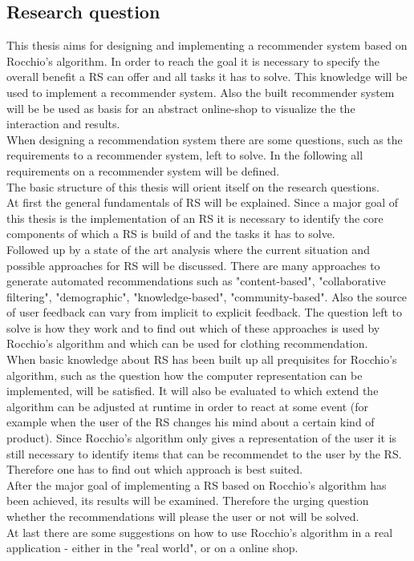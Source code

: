 \subsection{Research question}
This thesis aims for designing and implementing a recommender system based on Rocchio's algorithm.
In order to reach the goal it is necessary to specify the overall benefit a RS can offer and all tasks it has to solve.
This knowledge will be used to implement a recommender system.
Also the built recommender system will be be used as basis for an abstract online-shop to visualize the the interaction and results.
\\
When designing a recommendation system there are some questions, such as the requirements to a recommender system, left to solve.
In the following all requirements on a recommender system will be defined.
\\
The basic structure of this thesis will orient itself on the research questions.
\\
At first the general fundamentals of RS will be explained.
Since a major goal of this thesis is the implementation of an RS it is necessary to identify the core components of which a RS is build of and the tasks it has to solve.
\\
Followed up by a state of the art analysis where the current situation and possible approaches for RS will be discussed.
There are many approaches to generate automated recommendations such as "content-based", "collaborative filtering", "demographic", "knowledge-based", "community-based".\citep[p.~10-12]{ricci:2011}
Also the source of user feedback can vary from implicit to explicit feedback.\citep[p.~76]{lops:2011}
The question left to solve is how they work and to find out which of these approaches is used by Rocchio's algorithm and which can be used for clothing recommendation.
\\
When basic knowledge about RS has been built up all prequisites for Rocchio's algorithm, such as the question how the computer representation can be implemented, will be satisfied.
It will also be evaluated to which extend the algorithm can be adjusted at runtime in order to react at some event (for example when the user of the RS changes his mind about a certain kind of product).
Since Rocchio's algorithm only gives a representation of the user it is still necessary to identify items that can be recommendet to the user by the RS.
Therefore one has to find out which approach is best suited.
\\
After the major goal of implementing a RS based on Rocchio's algorithm has been achieved, its results will be examined.
Therefore the urging question whether the recommendations will please the user or not will be solved.
\\
At last there are some suggestions on how to use Rocchio's algorithm in a real application - either in the "real world", or on a online shop.


